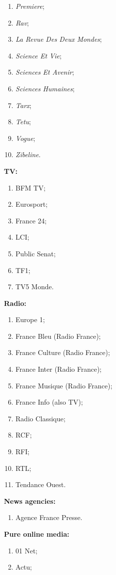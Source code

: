 \begin{multicols}{2}
\begin{enumerate}
	\item \textit{Premiere};
	\item \textit{Rav};
	\item \textit{La Revue Des Deux Mondes};
	\item \textit{Science Et Vie};
	\item \textit{Sciences Et Avenir};
	\item \textit{Sciences Humaines};
	\item \textit{Tarx};
	\item \textit{Tetu};
	\item \textit{Vogue};
	\item \textit{Zibeline}.
	\end{enumerate}		
\medskip
\textbf{TV:}
	\begin{enumerate}
	\item BFM TV;
	\item Eurosport;
	\item France 24;
	\item LCI;
	\item Public Senat;
	\item TF1;
	\item TV5 Monde.
	\end{enumerate}
\medskip
\textbf{Radio:}
	\begin{enumerate}
	\item Europe 1;
	\item France Bleu (Radio France);
	\item France Culture (Radio France);
	\item France Inter (Radio France);
	\item France Musique (Radio France);
	\item France Info (also TV);
	\item Radio Classique;
	\item RCF;
	\item RFI;
	\item RTL;
	\item Tendance Ouest.
	\end{enumerate}				
\medskip
\textbf{News agencies:} 
	\begin{enumerate}
	\item Agence France Presse.
	\end{enumerate}	
\medskip
\textbf{Pure online media:}
	\begin{enumerate}
	\item 01 Net;
	\item Actu;

\end{enumerate}
\end{multicols}
